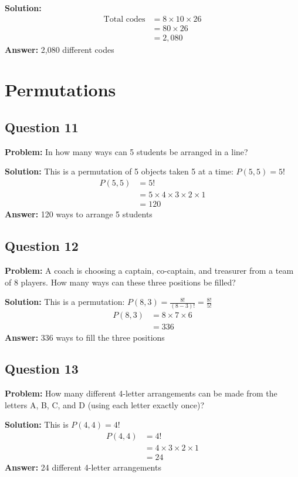 \documentclass[12pt]{article}
\begin{document}
\textbf{Solution:}
\begin{align*}
\text{Total codes} &= 8 \times 10 \times 26 \\
&= 80 \times 26 \\
&= 2{,}080
\end{align*}
\textbf{Answer:} 2,080 different codes

\section{Permutations}

\subsection*{Question 11}
\textbf{Problem:} In how many ways can 5 students be arranged in a line?

\textbf{Solution:} This is a permutation of 5 objects taken 5 at a time: $P(5,5) = 5!$
\begin{align*}
P(5,5) &= 5! \\
&= 5 \times 4 \times 3 \times 2 \times 1 \\
&= 120
\end{align*}
\textbf{Answer:} 120 ways to arrange 5 students

\subsection*{Question 12}
\textbf{Problem:} A coach is choosing a captain, co-captain, and treasurer from a team of 8 players. How many ways can these three positions be filled?

\textbf{Solution:} This is a permutation: $P(8,3) = \frac{8!}{(8-3)!} = \frac{8!}{5!}$
\begin{align*}
P(8,3) &= 8 \times 7 \times 6 \\
&= 336
\end{align*}
\textbf{Answer:} 336 ways to fill the three positions

\subsection*{Question 13}
\textbf{Problem:} How many different 4-letter arrangements can be made from the letters A, B, C, and D (using each letter exactly once)?

\textbf{Solution:} This is $P(4,4) = 4!$
\begin{align*}
P(4,4) &= 4! \\
&= 4 \times 3 \times 2 \times 1 \\
&= 24
\end{align*}
\textbf{Answer:} 24 different 4-letter arrangements
\end{document}
